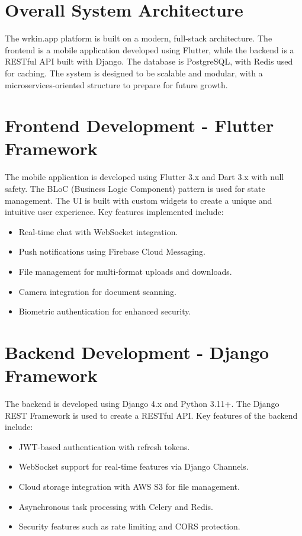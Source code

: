 \section{Overall System Architecture}
The wrkin.app platform is built on a modern, full-stack architecture. The frontend is a mobile application developed using Flutter, while the backend is a RESTful API built with Django. The database is PostgreSQL, with Redis used for caching. The system is designed to be scalable and modular, with a microservices-oriented structure to prepare for future growth.

\section{Frontend Development - Flutter Framework}
The mobile application is developed using Flutter 3.x and Dart 3.x with null safety. The BLoC (Business Logic Component) pattern is used for state management. The UI is built with custom widgets to create a unique and intuitive user experience. Key features implemented include:
\begin{itemize}
    \item Real-time chat with WebSocket integration.
    \item Push notifications using Firebase Cloud Messaging.
    \item File management for multi-format uploads and downloads.
    \item Camera integration for document scanning.
    \item Biometric authentication for enhanced security.
\end{itemize}

\section{Backend Development - Django Framework}
The backend is developed using Django 4.x and Python 3.11+. The Django REST Framework is used to create a RESTful API. Key features of the backend include:
\begin{itemize}
    \item JWT-based authentication with refresh tokens.
    \item WebSocket support for real-time features via Django Channels.
    \item Cloud storage integration with AWS S3 for file management.
    \item Asynchronous task processing with Celery and Redis.
    \item Security features such as rate limiting and CORS protection.
\end{itemize}

